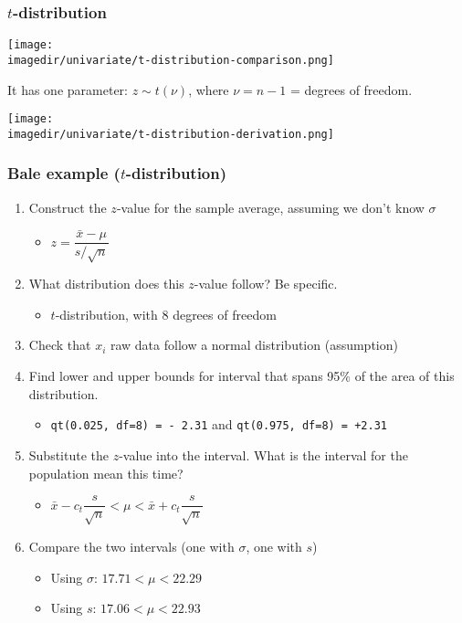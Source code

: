 \begin{frame}\frametitle{$t$-distribution}
	\begin{center}
		\texttt{[image: \\imagedir/univariate/t-distribution-comparison.png]}
	\end{center}
	It has one parameter: $z \sim t\left(\nu\right)$, where $\nu = n-1$ = degrees of freedom.
	\begin{center}
		\texttt{[image: \\imagedir/univariate/t-distribution-derivation.png]}
	\end{center}
\end{frame}

\begin{frame}\frametitle{Bale example ($t$-distribution)}
	\begin{enumerate}
		\item	Construct the $z$-value for the sample average, assuming we don't know $\sigma$ 
		\begin{itemize}
			\item	$z = \dfrac{\bar{x} - \mu}{s/\sqrt{n}}$
		\end{itemize}
		\item	What distribution does this $z$-value follow? Be specific. 
		\begin{itemize}
			\item	$t$-distribution, with 8 degrees of freedom
		\end{itemize}
		\item	Check that $x_i$ raw data follow a normal distribution (assumption)
		\item	Find lower and upper bounds for interval that spans 95\% of the area of this distribution. 
		\begin{itemize}
			\item	\texttt{qt(0.025, df=8) = - 2.31} and \texttt{qt(0.975, df=8) = +2.31}
		\end{itemize}
		\item	Substitute the $z$-value into the interval. What is the interval for the population mean this time? 
		\begin{itemize}
			\item	$\bar{x} - c_t\dfrac{s}{\sqrt{n}} < \mu < \bar{x} + c_t\dfrac{s}{\sqrt{n}}$
		\end{itemize}
		\item	Compare the two intervals (one with $\sigma$, one with $s$)
		\begin{itemize}
			\item	Using $\sigma$: $17.71 < \mu < 22.29$
			\item	Using $s$: $17.06 < \mu < 22.93$
		\end{itemize}
	\end{enumerate}
\end{frame}

